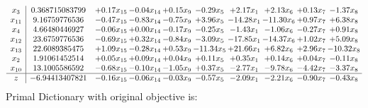 \documentclass[9pt]{article}
\begin{document}
\[\begin{array}{c| c c@{\hskip 2pt} c@{\hskip 2pt} c@{\hskip 2pt} c@{\hskip 2pt} c@{\hskip 2pt} c@{\hskip 2pt} c@{\hskip 2pt} c@{\hskip 2pt} }
 x_{3}   &  0.368715083799 & +  0.17 x_{15} & -0.04 x_{14} & +  0.15 x_{9} & -0.29 x_{5} & +  2.17 x_{1} & +  2.13 x_{6} & +  0.13 x_{7} & -1.37 x_{8}\\
 x_{11}   &  9.16759776536 & -0.47 x_{15} & -0.83 x_{14} & -0.75 x_{9} & +  3.96 x_{5} & -14.28 x_{1} & -11.30 x_{6} & +  0.97 x_{7} & +  6.38 x_{8}\\
 x_{4}   &  4.66480446927 & -0.06 x_{15} & +  0.00 x_{14} & -0.17 x_{9} & -0.25 x_{5} & -1.43 x_{1} & -1.06 x_{6} & -0.27 x_{7} & +  0.91 x_{8}\\
 x_{12}   &  23.6759776536 & -0.69 x_{15} & +  0.32 x_{14} & -0.84 x_{9} & -3.09 x_{5} & -17.85 x_{1} & -14.37 x_{6} & +  1.02 x_{7} & +  5.09 x_{8}\\
 x_{13}   &  22.6089385475 & +  1.09 x_{15} & -0.28 x_{14} & +  0.53 x_{9} & -11.34 x_{5} & + 21.66 x_{1} & +  6.82 x_{6} & +  2.96 x_{7} & -10.32 x_{8}\\
 x_{2}   &  1.91061452514 & +  0.05 x_{15} & +  0.09 x_{14} & +  0.04 x_{9} & +  0.11 x_{5} & +  0.35 x_{1} & +  0.14 x_{6} & +  0.04 x_{7} & -0.11 x_{8}\\
 x_{10}   &  13.1005586592 & -0.68 x_{15} & -0.10 x_{14} & -1.05 x_{9} & +  0.37 x_{5} & -2.77 x_{1} & -9.78 x_{6} & -4.42 x_{7} & -3.37 x_{8}\\
\hline
z    &  -6.94413407821 & -0.16 x_{15} & -0.06 x_{14} & -0.03 x_{9} & -0.57 x_{5} & -2.09 x_{1} & -2.21 x_{6} & -0.90 x_{7} & -0.43 x_{8}\\
\end{array}\]
Primal Dictionary with original objective is:
\end{document}
